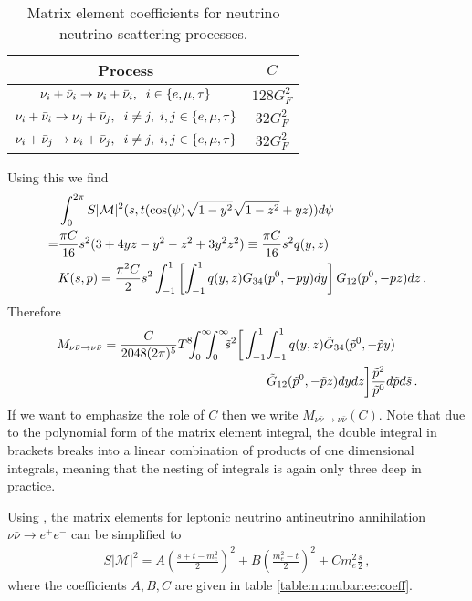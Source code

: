 \begin{table}[ht]
\centering 
\begin{tabular}{|c|c|}
\hline
Process &$C$  \\
\hline
$\nu_i+\bar\nu_i\rightarrow\nu_i+\bar\nu_i,\hspace{2mm} i\in\{e,\mu,\tau\}$& $128 G_F^2$\\
\hline
$\nu_i+\bar\nu_i\rightarrow\nu_j+\bar\nu_j,\hspace{2mm} i\neq j, \hspace{1mm} i,j\in\{e,\mu,\tau\}$& $32 G_F^2$\\
\hline
$\nu_i+\bar\nu_j\rightarrow\nu_i+\bar\nu_j,\hspace{2mm} i\neq j, \hspace{1mm} i,j\in\{e,\mu,\tau\}$& $32 G_F^2$\\
\hline
\end{tabular}
\caption{Matrix element coefficients for neutrino neutrino scattering processes.}
\label{table:nu:nubar:coeff}
\end{table}
Using this we find
 \begin{align}
&\int_0^{2\pi} S |\mathcal{M}|^2 (s,t(\cos(\psi)\sqrt{1-y^2}\sqrt{1-z^2}+yz))d\psi\\
=&\frac{\pi C}{16} s^2(3+4 yz-y^2-z^2+3y^2z^2)
\equiv\frac{\pi C}{16} s^2q(y,z)\,\notag\\
&K(s,p)=\frac{\pi^2C}{2}s^2\int_{-1}^1 \left[\int_{-1}^1q(y,z)G_{34}(p^0,-p y) dy\right] G_{12}(p^0,-p z)dz\,.\notag
\end{align}
Therefore
\begin{align}\label{eq:M:nu:nubar}
&M_{\nu\bar\nu\rightarrow\nu\bar\nu}=\frac{C}{2048(2\pi)^5 }T^8\!\!\!\int_0^\infty\!\!\!\!\int_0^\infty\!\!\! \tilde{s}^2\bigg[\int_{-1}^1\!\int_{-1}^1q(y,z)\tilde{G}_{34}(\tilde p^0,-\tilde{p} y)\notag\\
&\hspace{58mm}\tilde{G}_{12}(\tilde p^0,-\tilde{p} z)dydz\bigg]\frac{\tilde{p}^2}{\tilde{p}^0}d\tilde{p}d\tilde{s}\,.\notag
\end{align}
 If we want to emphasize the role of $C$ then we write $M_{\nu\bar\nu\rightarrow\nu\bar\nu}(C)$. Note that due to the polynomial form of the matrix element integral, the double integral in brackets breaks into a linear combination of products of one dimensional integrals, meaning that the nesting of integrals is again only three deep in  practice.

Using , the matrix elements for leptonic neutrino antineutrino annihilation $\nu\bar{\nu}\rightarrow e^+e^-$ can be simplified to
\begin{align}
S|\mathcal{M}|^2=A\left(\frac{s+t-m_e^2}{2}\right)^2+B\left(\frac{m_e^2-t}{2}\right)^2+Cm_e^2\frac{s}{2}\,,
\end{align}
where the coefficients $A,B,C$ are given in table \ref{table:nu:nubar:ee:coeff}.

